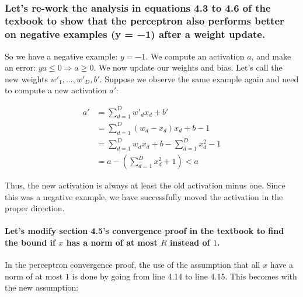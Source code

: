 \documentclass[11pt]{article}
\begin{document}
    \begin{center}
    \end{center}
    { \hspace*{\fill} \\}
    
    \subsubsection{Let's re-work the analysis in equations 4.3 to 4.6 of the
texbook to show that the perceptron also performs better on negative
examples (y = −1) after a weight
update.}\label{lets-re-work-the-analysis-in-equations-4.3-to-4.6-of-the-texbook-to-show-that-the-perceptron-also-performs-better-on-negative-examples-y-1-after-a-weight-update.}

So we have a negative example: \(y = -1\). We compute an activation
\(a\), and make an error: \(ya \leq 0 \Rightarrow a \geq 0\). We now
update our weights and bias. Let's call the new weights
\(w'_1, \dots, w'_D, b'\). Suppose we observe the same example again and
need to compute a new activation \(a'\):

\begin{align*}
a' &= \sum_{d=1}^{D} w'_d x_d  + b' \\ 
 &= \sum_{d=1}^{D} (w_d - x_d)x_d  + b - 1  \\ 
 &= \sum_{d=1}^{D} w_d x_d + b - \sum_{d=1}^{D} x_d^2 - 1 \\ 
 &= a - \left ( \sum_{d=1}^{D} x_d^2 + 1  \right ) < a 
\end{align*}

Thus, the new activation is always at least the old activation minus
one. Since this was a negative example, we have successfully moved the
activation in the proper direction.

    \paragraph{\texorpdfstring{Let's modify section 4.5's convergence proof
in the textbook to find the bound if \(x\) has a norm of at most \(R\)
instead of
\(1\).}{Let's modify section 4.5's convergence proof in the textbook to find the bound if x has a norm of at most R instead of 1.}}\label{lets-modify-section-4.5s-convergence-proof-in-the-textbook-to-find-the-bound-if-x-has-a-norm-of-at-most-r-instead-of-1.}

In the perceptron convergence proof, the use of the assumption that all
\(x\) have a norm of at most \(1\) is done by going from line 4.14 to
line 4.15. This becomes with the new assumption:
\end{document}
